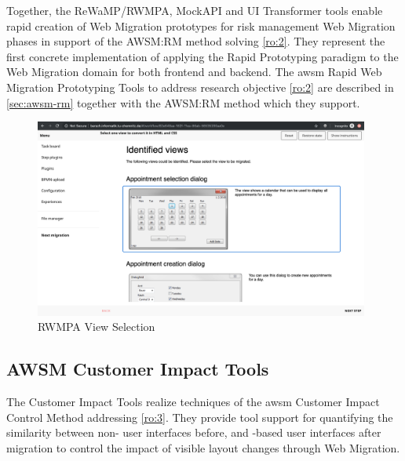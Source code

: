 Together, the ReWaMP/RWMPA, MockAPI and UI Transformer tools enable rapid creation of \gls{Web Migration} prototypes for risk management \gls{Web Migration} phases in support of the AWSM:RM method solving \cref{ro:2}.
They represent the first concrete implementation of applying the \gls{Rapid Prototyping} paradigm to the \gls{Web Migration} domain for both frontend and backend.
The \gls{awsm} \gls{Rapid Web Migration Prototyping} Tools to address research objective \cref{ro:2} are described in \cref{sec:awsm-rm} together with the AWSM:RM method which they support.
\begin{figure}[h!]
\hypertarget{fig:rwmpa-select}{%
\centering
\includegraphics[width=0.98\textwidth]{../figures/screenshots/rwmpa-select.png}
\caption{RWMPA View Selection}\label{fig:rwmpa-select}
}
\end{figure}

\vspace{-20pt}
\hypertarget{sec:tools.ci}{%
\subsection{AWSM Customer Impact Tools}\label{sec:tools.ci}}
\vspace{10pt}

The Customer Impact Tools realize techniques of the \gls{awsm} Customer Impact Control Method addressing \cref{ro:3}.
They provide tool support for quantifying the similarity between  non- user interfaces before, and -based user interfaces after migration to control the impact of visible layout changes through \gls{Web Migration}.

